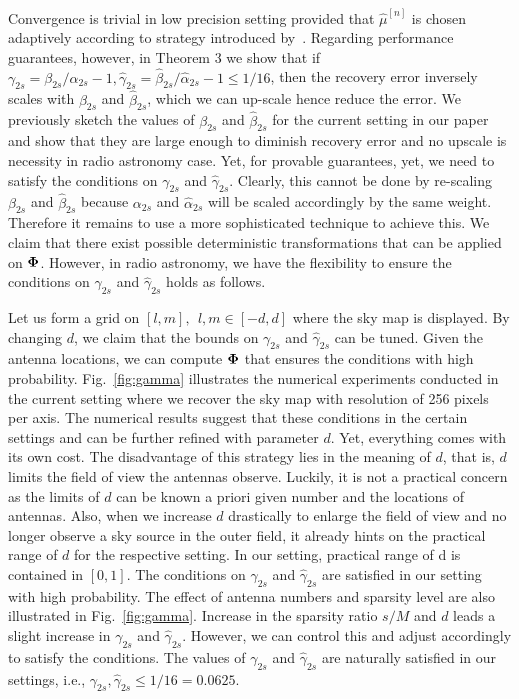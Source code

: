 \documentclass{article}
\begin{document}
Convergence is trivial in low precision setting provided that $\hat{\mu}^{[n]}$ is chosen adaptively according to strategy introduced by~\cite{blumensath2010niht}. Regarding performance guarantees, however, in Theorem 3 we show that if $\gamma_{2s} = \beta_{2s}/\alpha_{2s}-1, \hat{\gamma}_{2s} = \hat{\beta}_{2s}/\hat{\alpha}_{2s}-1\leq 1/16$, then the recovery error inversely scales with $\beta_{2s}$ and $\hat{\beta}_{2s}$, which we can up-scale hence reduce the error. We previously sketch the values of $\beta_{2s}$ and $\hat{\beta}_{2s}$ for the current setting in our paper and show that they are large enough to diminish recovery error and no upscale is necessity in radio astronomy case. Yet, for provable guarantees, yet, we need to satisfy the conditions on $\gamma_{2s}$ and $\hat{\gamma}_{2s}$. Clearly, this cannot be done by re-scaling $\beta_{2s}$ and $\hat{\beta}_{2s}$ because $\alpha_{2s}$ and $\hat{\alpha}_{2s}$ will be scaled accordingly by the same weight. Therefore it remains to use a more sophisticated technique to achieve this. We claim that there exist possible deterministic transformations that can be applied on ${\bf \Phi}$. However, in radio astronomy, we have the flexibility to ensure the conditions on $\gamma_{2s}$ and $\hat{\gamma}_{2s}$ holds as follows. 

Let us form a grid on $[l, m], \  \ l, m \in [-d, d]$ where the sky map is displayed. By changing $d$, we claim that the bounds on $\gamma_{2s}$ and $\hat{\gamma}_{2s}$ can be tuned. Given the antenna locations, we can compute ${\bf \Phi}$ that ensures the conditions with high probability. Fig.~\ref{fig:gamma} illustrates the numerical experiments conducted in the current setting where we recover the sky map with resolution of 256 pixels per axis. The numerical results suggest that these conditions in the certain settings and can be further refined with parameter $d$. Yet, everything comes with its own cost. The disadvantage of this strategy lies in the meaning of $d$, that is, $d$ limits the field of view the antennas observe. Luckily, it is not a practical concern as the limits of $d$ can be known a priori given number and the locations of antennas. Also, when we increase $d$ drastically to enlarge the field of view and no longer observe a sky source in the outer field, it already hints on the practical range of $d$ for the respective setting. In our setting, practical range of d is contained in $[0, 1]$. The conditions on $\gamma_{2s}$ and $\hat{\gamma}_{2s}$ are satisfied in our setting with high probability. The effect of antenna numbers and sparsity level are also illustrated in Fig.~\ref{fig:gamma}. Increase in the sparsity ratio $s/M$ and $d$ leads a slight increase in $\gamma_{2s}$ and $\hat{\gamma}_{2s}$. However, we can control this and adjust accordingly to satisfy the conditions. The values of $\gamma_{2s}$ and $\hat{\gamma}_{2s}$ are naturally satisfied in our settings, i.e., $\gamma_{2s}, \hat{\gamma}_{2s}\leq 1/16=0.0625$.
\end{document}

